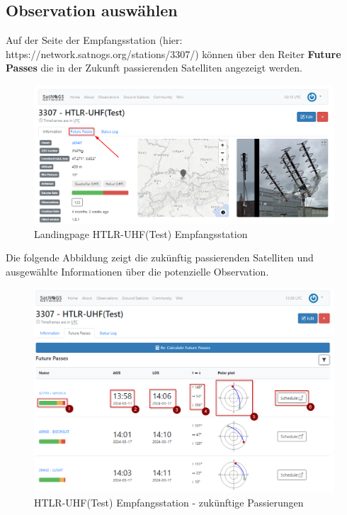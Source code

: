 \subsection{Observation auswählen}
Auf der Seite der Empfangsstation (hier: https://network.satnogs.org/stations/3307/) können über den Reiter \textbf{Future Passes}  die in der Zukunft passierenden Satelliten angezeigt werden.

\begin{figure} [H]
	\centering
	\includegraphics[width=\linewidth]{../ref/schedule_observation_futurepass.png}
	\caption{Landingpage HTLR-UHF(Test) Empfangsstation \cite{noauthor_satnogs_nodate}}
	\label{fig:htrl-uhf(test)landingpage}
\end{figure}

Die folgende Abbildung zeigt die zukünftig passierenden Satelliten und ausgewählte Informationen über die potenzielle Observation.

\begin{figure} [H]
	\centering
	\includegraphics[width=\linewidth]{../ref/schedule_observation_infos.png}
	\caption{HTLR-UHF(Test) Empfangsstation - zukünftige Passierungen \cite{noauthor_satnogs_nodate}}
	\label{fig:htrl-uhf(test)futurepasses}
\end{figure}

